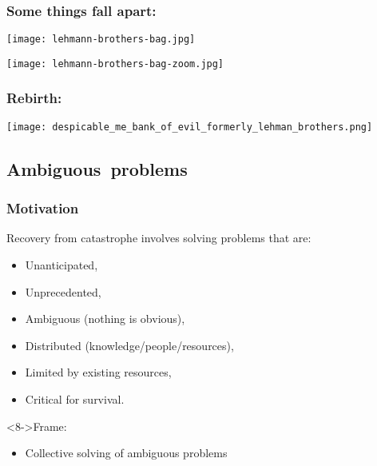 \begin{frame}
  \frametitle{Some things fall apart:}
  \texttt{[image: lehmann-brothers-bag.jpg]}
\end{frame}

\begin{frame}
  \texttt{[image: lehmann-brothers-bag-zoom.jpg]}
\end{frame}

\begin{frame}
  \frametitle{Rebirth:}
  \texttt{[image: despicable\_me\_bank\_of\_evil\_formerly\_lehman\_brothers.png]}
\end{frame}

\subsection{Ambiguous\ problems}

\begin{frame}
  \frametitle{Motivation}

  \begin{block}{Recovery from catastrophe involves solving problems that are:}
    \begin{itemize}
    \item<2-> 
      Unanticipated,
    \item<3-> 
      Unprecedented,
    \item<4->
      Ambiguous (nothing is obvious),
    \item<5-> 
      Distributed (knowledge/people/resources),
    \item<6-> 
      Limited by existing resources,
    \item<7-> 
      Critical for survival.
    \end{itemize}
  \end{block}

  \begin{block}<8->{Frame:}
    \begin{itemize}
    \item<8-> 
      Collective solving of ambiguous problems
    \end{itemize}
  \end{block}

\end{frame}

